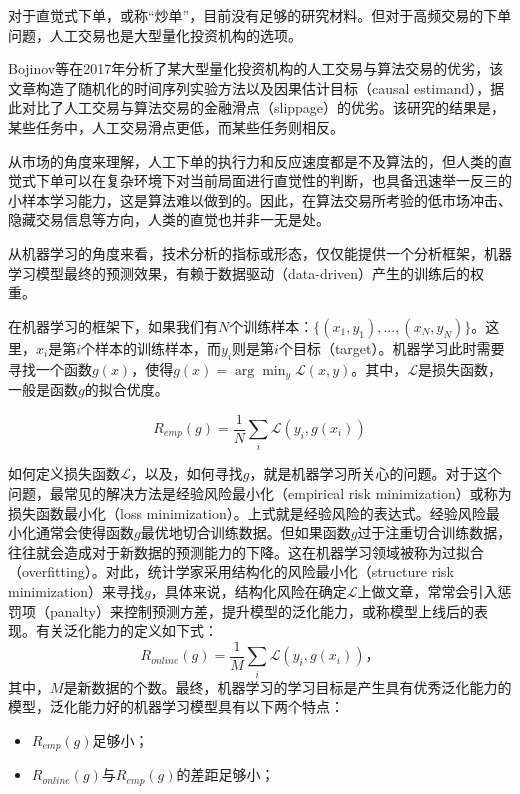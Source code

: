 \documentclass[twoside,longtitle]{LZUthesis}
\begin{document}
对于直觉式下单，或称“炒单”，目前没有足够的研究材料。但对于高频交易的下单问题，人工交易也是大型量化投资机构的选项。

Bojinov等在2017年分析了某大型量化投资机构的人工交易与算法交易的优劣，该文章构造了随机化的时间序列实验方法以及因果估计目标（causal estimand），据此对比了人工交易与算法交易的金融滑点（slippage）的优劣\cite{Iavor2019Time}。该研究的结果是，某些任务中，人工交易滑点更低，而某些任务则相反。

从市场的角度来理解，人工下单的执行力和反应速度都是不及算法的，但人类的直觉式下单可以在复杂环境下对当前局面进行直觉性的判断，也具备迅速举一反三的小样本学习能力，这是算法难以做到的。因此，在算法交易所考验的低市场冲击、隐藏交易信息等方向，人类的直觉也并非一无是处。

从机器学习的角度来看，技术分析的指标或形态，仅仅能提供一个分析框架，机器学习模型最终的预测效果，有赖于数据驱动（data-driven）产生的训练后的权重。

在机器学习的框架下，如果我们有$N$个训练样本：$\{(x_1,y_1),...,(x_N,y_N)\}$。这里，$x_i$是第$i$个样本的训练样本，而$ y_i $则是第$ i $个目标（target）。机器学习此时需要寻找一个函数$ g(x) $，使得$ g(x)=\arg\min_y \mathcal{L}(x,y) $。其中，$ \mathcal{L} $是损失函数，一般是函数$g$的拟合优度。

\begin{equation}
R_{emp}(g)=\frac{1}{N}\sum_i \mathcal{L} (y_i, g(x_i))
\end{equation}

如何定义损失函数$\mathcal{L}$，以及，如何寻找$g$，就是机器学习所关心的问题。对于这个问题，最常见的解决方法是经验风险最小化（empirical risk minimization）或称为损失函数最小化（loss minimization）\cite{Vapnik2000The}。上式就是经验风险的表达式。经验风险最小化通常会使得函数$g$最优地切合训练数据。但如果函数$g$过于注重切合训练数据，往往就会造成对于新数据的预测能力的下降。这在机器学习领域被称为过拟合（overfitting）。对此，统计学家采用结构化的风险最小化（structure risk minimization）来寻找$g$，具体来说，结构化风险在确定$\mathcal{L}$上做文章，常常会引入惩罚项（panalty）来控制预测方差，提升模型的泛化能力，或称模型上线后的表现。有关泛化能力的定义如下式：
\begin{equation}
R_{online}(g)=\frac{1}{M}\sum_i \mathcal{L}(y_i, g(x_i))，
\end{equation}
其中，$M$是新数据的个数。最终，机器学习的学习目标是产生具有优秀泛化能力的模型，泛化能力好的机器学习模型具有以下两个特点：
\begin{itemize}
	\item $ R_{emp}(g) $足够小；
	\item $R_{online}(g)$与$ R_{emp}(g) $的差距足够小；
\end{itemize}
\end{document}
